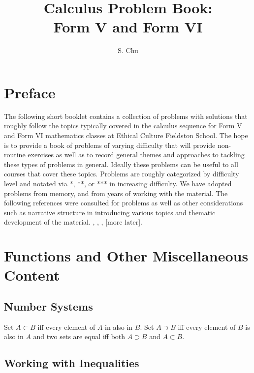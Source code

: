 \documentclass{amsbook}
\begin{document}
\title{Calculus Problem Book:\\
    \Large Form V and Form VI}


\author{S. Chu}

\maketitle
\tableofcontents
\chapter*{Preface}
The following short booklet contains a collection of problems with solutions that roughly follow the topics typically covered in the calculus sequence for Form V and Form VI mathematics classes at Ethical Culture Fieldston School. The hope is to provide a book of problems of varying difficulty that will provide non-routine exercises as well as to record general themes and approaches to tackling these types of problems in general. Ideally these problems can be useful to all courses that cover these topics. Problems are roughly categorized by difficulty level and notated via *, **, or *** in increasing difficulty. We have adopted problems from memory, and from years of working with the material. The following references were consulted for problems as well as other considerations such as narrative structure in introducing various topics and thematic development of the material. \cite{mcirc}, \cite{aops}, \cite{hpn}, [more later].
\chapter{Functions and Other Miscellaneous Content}

\section{Number Systems}
\begin{Exercise}[title={Sets and Types of Numbers}, difficulty = 0, label= 1b1]
	Set $A \subset B$ iff every element of $A$ in also in $B$. Set $A \supset B$ iff every element of $B$ is also in $A$ and two sets are equal iff both $A\supset B$ and $A\subset B$.
	
\end{Exercise}


\section{Working with Inequalities}
\end{document}
